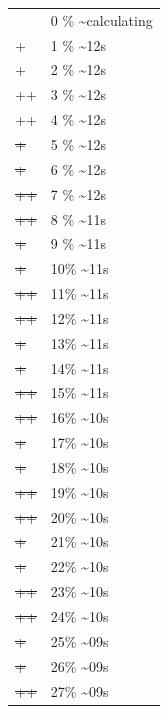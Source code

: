 \documentclass[12pt]{article}
\begin{document}
\begin{center}
\begin{tabular}{ll}
 & 0 \% \textasciitilde{}calculating\\
+ & 1 \% \textasciitilde{}12s\\
+ & 2 \% \textasciitilde{}12s\\
++ & 3 \% \textasciitilde{}12s\\
++ & 4 \% \textasciitilde{}12s\\
\sout{+} & 5 \% \textasciitilde{}12s\\
\sout{+} & 6 \% \textasciitilde{}12s\\
\sout{++} & 7 \% \textasciitilde{}12s\\
\sout{++} & 8 \% \textasciitilde{}11s\\
\sout{\sout{+}} & 9 \% \textasciitilde{}11s\\
\sout{\sout{+}} & 10\% \textasciitilde{}11s\\
\sout{\sout{++}} & 11\% \textasciitilde{}11s\\
\sout{\sout{++}} & 12\% \textasciitilde{}11s\\
\sout{\sout{\sout{+}}} & 13\% \textasciitilde{}11s\\
\sout{\sout{\sout{+}}} & 14\% \textasciitilde{}11s\\
\sout{\sout{\sout{++}}} & 15\% \textasciitilde{}11s\\
\sout{\sout{\sout{++}}} & 16\% \textasciitilde{}10s\\
\sout{\sout{\sout{\sout{+}}}} & 17\% \textasciitilde{}10s\\
\sout{\sout{\sout{\sout{+}}}} & 18\% \textasciitilde{}10s\\
\sout{\sout{\sout{\sout{++}}}} & 19\% \textasciitilde{}10s\\
\sout{\sout{\sout{\sout{++}}}} & 20\% \textasciitilde{}10s\\
\sout{\sout{\sout{\sout{\sout{+}}}}} & 21\% \textasciitilde{}10s\\
\sout{\sout{\sout{\sout{\sout{+}}}}} & 22\% \textasciitilde{}10s\\
\sout{\sout{\sout{\sout{\sout{++}}}}} & 23\% \textasciitilde{}10s\\
\sout{\sout{\sout{\sout{\sout{++}}}}} & 24\% \textasciitilde{}10s\\
\sout{\sout{\sout{\sout{\sout{\sout{+}}}}}} & 25\% \textasciitilde{}09s\\
\sout{\sout{\sout{\sout{\sout{\sout{+}}}}}} & 26\% \textasciitilde{}09s\\
\sout{\sout{\sout{\sout{\sout{\sout{++}}}}}} & 27\% \textasciitilde{}09s\\

\end{tabular}
\end{center}
\end{document}
